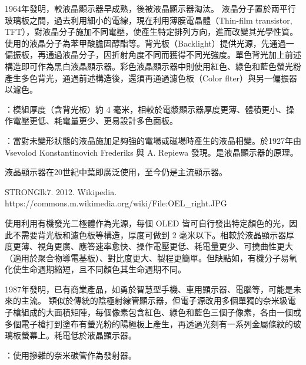 \documentclass[a4paper,12pt]{report}
\begin{document}
\begin{itemize}
\begin{itemize}
1964年發明，較液晶顯示器早成熟，後被液晶顯示器淘汰。
\bct\bfH\ctr{}\ef\FB\ect
液晶分子置於兩平行玻璃板之間，過去利用細小的電線，現在利用薄膜電晶體（Thin-film transistor, TFT），對液晶分子施加不同電壓，使產生特定排列方向，進而改變其光學性質。使用的液晶分子為苯甲酸膽固醇酯等。背光板（Backlight）提供光源，先通過一偏振板，再通過液晶分子，因折射角度不同而獲得不同光強度。單色背光加上前述構造即可作為黑白液晶顯示器。彩色液晶顯示器中則使用紅色、綠色和藍色螢光粉產生多色背光，通過前述構造後，還須再通過濾色板（Color flter）與另一偏振器以濾色。

：模組厚度（含背光板）約 4 毫米，相較於電漿顯示器厚度更薄、體積更小、操作電壓更低、耗電量更少、更易設計多色面板。

：當對未變形狀態的液晶施加足夠強的電場或磁場時產生的液晶相變。於1927年由 Vsevolod Konstantinovich Frederiks 與 A. Repiewa 發現。是液晶顯示器的原理。

液晶顯示器在20世紀中葉即廣泛使用，至今仍是主流顯示器。
\bct\bfH\ctr{}\caption{STRONGlk7. 2012. Wikipedia. https://commons.m.wikimedia.org/wiki/File:OEL\_right.JPG}\ef\FB\ect
使用利用有機發光二極體作為光源，每個 OLED 皆可自行發出特定顏色的光，因此不需要背光板和濾色板等構造，厚度可做到 2 毫米以下。相較於液晶顯示器厚度更薄、視角更廣、應答速率愈快、操作電壓更低、耗電量更少、可撓曲性更大（適用於聚合物導電基板）、對比度更大、製程更簡單。但缺點如，有機分子易氧化使生命週期縮短，且不同顏色其生命週期不同。

1987年發明，已有商業產品，如勇於智慧型手機、車用顯示器、電腦等，可能是未來的主流。
類似於傳統的陰極射線管顯示器，但電子源改用多個單獨的奈米級電子槍組成的大面積矩陣，每個像素包含紅色、綠色和藍色三個子像素，各由一個或多個電子槍打到塗布有螢光粉的陽極板上產生，再透過光刻有一系列金屬條紋的玻璃板螢幕上。耗電低於液晶顯示器。

：使用摻雜的奈米碳管作為發射器。


\end{itemize}
\end{itemize}
\end{document}

